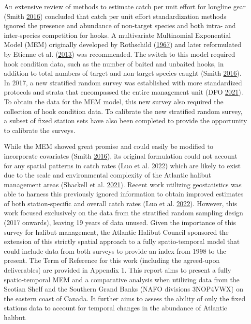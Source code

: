 \documentclass[12pt]{article}\usepackage[]{graphicx}\usepackage[]{color}
\begin{document}
An extensive review of methods to estimate catch per unit effort for longline gear (Smith \protect\hyperlink{ref-Smith2016a}{2016}) concluded that catch per unit effort standardization methods ignored the presence and abundance of non-target species and both intra- and inter-species competition for hooks. A multivariate Multinomial Exponential Model (MEM) originally developed by Rothschild (\protect\hyperlink{ref-Rothschild1967}{1967}) and later reformulated by Etienne et al. (\protect\hyperlink{ref-Etienne2013}{2013}) was recommended. The switch to this model required hook condition data, such as the number of baited and unbaited hooks, in addition to total numbers of target and non-target species caught (Smith \protect\hyperlink{ref-Smith2016a}{2016}). In 2017, a new stratified random survey was established with more standardized protocols and strata that encompassed the entire management unit (DFO \protect\hyperlink{ref-DFO2021}{2021}). To obtain the data for the MEM model, this new survey also required the collection of hook condition data. To calibrate the new stratified random survey, a subset of fixed station sets have also been completed to provide the opportunity to calibrate the surveys.

While the MEM showed great promise and could easily be modified to incorporate covariates (Smith \protect\hyperlink{ref-Smith2016a}{2016}), its original formulation could not account for any spatial patterns in catch rates (Luo et al. \protect\hyperlink{ref-Luo2022}{2022}) which are likely to exist due to the scale and environmental complexity of the Atlantic halibut management areas (Shackell et al. \protect\hyperlink{ref-Shackell2021}{2021}). Recent work utilizing geostatistics was able to harness this previously ignored information to obtain improved estimates of both station-specific and overall catch rates (Luo et al. \protect\hyperlink{ref-Luo2022}{2022}). However, this work focused exclusively on the data from the stratified random sampling design (2017 onwards), leaving 19 years of data unused. Given the importance of this survey for halibut management, the Atlantic Halibut Council sponsored the extension of this strictly spatial approach to a fully spatio-temporal model that could include data from both surveys to provide an index from 1998 to the present. The Term of Reference for this work (including the agreed-upon deliverables) are provided in Appendix 1. This report aims to present a fully spatio-temporal MEM and a comparative analysis when utilizing data from the Scotian Shelf and the Southern Grand Banks (NAFO divisions 3NOP4VWX) on the eastern coast of Canada. It further aims to assess the ability of only the fixed stations data to account for temporal changes in the abundance of Atlantic halibut.
\end{document}
